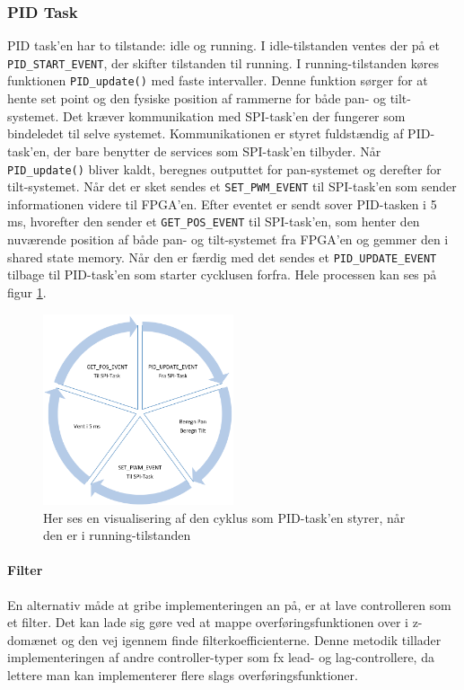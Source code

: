 \subsubsection{PID Task}

PID task'en har to tilstande: idle og running. I idle-tilstanden ventes der på et \texttt{PID\_START\_EVENT}, der skifter tilstanden til running. I running-tilstanden køres funktionen \texttt{PID\_update()} med faste intervaller. Denne funktion sørger for at hente set point og den fysiske position af rammerne for både pan- og tilt-systemet. Det kræver kommunikation med SPI-task'en der fungerer som bindeledet til selve systemet. Kommunikationen er styret fuldstændig af PID-task'en, der bare benytter de services som SPI-task'en tilbyder. Når \texttt{PID\_update()} bliver kaldt, beregnes outputtet for pan-systemet og derefter for tilt-systemet. Når det er sket sendes et \texttt{SET\_PWM\_EVENT} til SPI-task'en som sender informationen videre til FPGA'en. Efter eventet er sendt sover PID-tasken i 5 ms, hvorefter den sender et \texttt{GET\_POS\_EVENT} til SPI-task'en, som henter den nuværende position af både pan- og tilt-systemet fra FPGA'en og gemmer den i shared state memory. Når den er færdig med det sendes et \texttt{PID\_UPDATE\_EVENT} tilbage til PID-task'en som starter cycklusen forfra. Hele processen kan ses på figur \ref{fig:PID_update}.

\begin{figure}
	\begin{center}
		\includegraphics[width=0.5\textwidth]{Billeder/PID_update.png}
	\end{center}		
	\caption{Her ses en visualisering af den cyklus som PID-task'en styrer, når den er i running-tilstanden}
	\label{fig:PID_update}
\end{figure}

\paragraph{Filter}
En alternativ måde at gribe implementeringen an på, er at lave controlleren som et filter. Det kan lade sig gøre ved at mappe overføringsfunktionen over i z-domænet og den vej igennem finde filterkoefficienterne. Denne metodik tillader implementeringen af andre controller-typer som fx lead- og lag-controllere, da lettere man kan implementerer flere slags overføringsfunktioner.

